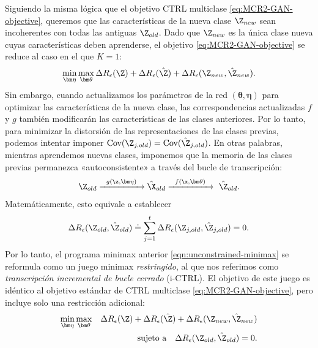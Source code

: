 \documentclass[../../book-main_es.tex]{subfiles}
\begin{document}
Siguiendo la misma lógica que el objetivo CTRL multiclase
\eqref{eq:MCR2-GAN-objective}, queremos que las características de la nueva
clase $\Z_{new}$ sean incoherentes con todas las antiguas $\Z_{old}$.
Dado que $\Z_{new}$ es la única clase nueva cuyas características deben
aprenderse, el objetivo \eqref{eq:MCR2-GAN-objective} se reduce al
caso en el que $K=1$:
\begin{equation}
    \min_{\bm \eta} \max_{\bm \theta} \Delta{R_\epsilon(\Z)} +
    \Delta{R_\epsilon(\hat{\Z})}+\Delta{R_\epsilon(\Z_{new},\hat{\Z}_{new})}.
    \label{eqn:unconstrained-minimax}
\end{equation}
Sin embargo, cuando actualizamos los parámetros de la red $(\bm \theta,\bm
\eta)$ para optimizar las características de la nueva clase, las
correspondencias actualizadas $f$ y $g$ también modificarán las características de las clases anteriores.
Por lo tanto, para minimizar la distorsión de las representaciones de las clases previas,
podemos intentar imponer $\mbox{Cov}(\Z_{j,old}) =
\mbox{Cov}(\hat{\Z}_{j,old})$. En otras palabras, mientras aprendemos nuevas
clases, imponemos que la memoria de las clases previas permanezca
«autoconsistente» a través del bucle de transcripción:
\begin{equation}
    \Z_{old} \xrightarrow{\hspace{2mm} g(\z,\bm \eta) \hspace{2mm}}
    \hat \X_{old} \xrightarrow{\hspace{2mm} f(\x, \bm
    \theta)\hspace{2mm}} \ \hat \Z_{old}.
\end{equation}
Matemáticamente, esto equivale a establecer
$$\Delta R_\epsilon(\Z_{old},\hat{\Z}_{old}) \doteq  \sum_{j=1}^t
\Delta R_\epsilon(\Z_{j,old},\hat{\Z}_{j,old}) = 0.$$
Por lo tanto, el programa minimax anterior \eqref{eqn:unconstrained-minimax} se
reformula como un juego minimax {\em restringido}, al que nos referimos como
{\em transcripción incremental de bucle cerrado} (i-CTRL).
El objetivo de este juego es idéntico al objetivo estándar de 
CTRL multiclase \eqref{eq:MCR2-GAN-objective}, pero incluye solo una
restricción adicional:
\begin{eqnarray}
    \min_{\bm \eta} \max_{\bm \theta}
    &&\Delta{R_\epsilon(\Z)}+\Delta{R_\epsilon(\hat{\Z})}+\Delta{R_\epsilon(\Z_{new},\hat{\Z}_{new})}
    \nonumber\\
    && \mbox{sujeto a} \quad  \Delta R_\epsilon(\Z_{old},\hat{\Z}_{old}) = 0.
    \label{eqn:constrained-minimax}
\end{eqnarray}
\end{document}
